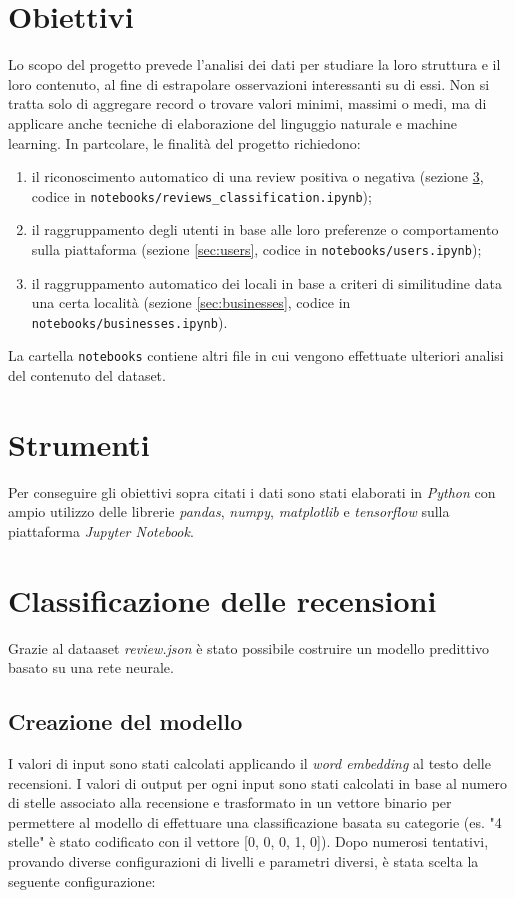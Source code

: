 \documentclass[12pt]{article}
\begin{document}
\section{Obiettivi}
Lo scopo del progetto prevede l'analisi dei dati per studiare la loro struttura e il loro contenuto, al fine di estrapolare osservazioni interessanti su di essi. Non si tratta solo di aggregare record o trovare valori minimi, massimi o medi, ma di applicare anche tecniche di elaborazione del linguggio naturale e machine learning. In partcolare, le finalità del progetto richiedono:
\begin{enumerate}[label=T\arabic*)]
\item il riconoscimento automatico di una review positiva o negativa (sezione \ref{sec:reviews}, codice in \texttt{notebooks/reviews\_classification.ipynb});
\item il raggruppamento degli utenti in base alle loro preferenze o comportamento sulla piattaforma (sezione \ref{sec:users}, codice in \texttt{notebooks/users.ipynb});
\item il raggruppamento automatico dei locali in base a criteri di similitudine data una certa località (sezione \ref{sec:businesses}, codice in \texttt{notebooks/businesses.ipynb}).
\end{enumerate}
La cartella \texttt{notebooks} contiene altri file in cui vengono effettuate ulteriori analisi del contenuto del dataset.


\section{Strumenti}
Per conseguire gli obiettivi sopra citati i dati sono stati elaborati in \textit{Python} con ampio utilizzo delle librerie \textit{pandas}, \textit{numpy}, \textit{matplotlib} e \textit{tensorflow} sulla piattaforma \textit{Jupyter Notebook}.

\section{Classificazione delle recensioni}
\label{sec:reviews}
Grazie al dataaset \textit{review.json} è stato possibile costruire un modello predittivo basato su una rete neurale.

\subsection{Creazione del modello}
I valori di input sono stati calcolati applicando il \textit{word embedding} al testo delle recensioni. I valori di output per ogni input sono stati calcolati in base al numero di stelle associato alla recensione e trasformato in un vettore binario per permettere al modello di effettuare una classificazione basata su categorie (es. "4 stelle" è stato codificato con il vettore [0, 0, 0, 1, 0]). \newline
Dopo numerosi tentativi, provando diverse configurazioni di livelli e parametri diversi, è stata scelta la seguente configurazione:

\end{document}
